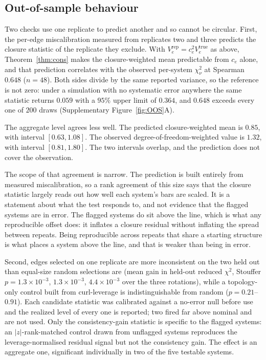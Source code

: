 \subsection{Out-of-sample behaviour}\label{sec:oos}
Two checks use one replicate to predict another and so cannot be circular. First, the per-edge
miscalibration measured from replicates two and three predicts the closure statistic of the
replicate they exclude. With $V_e^{\mathrm{rep}}=c_e^2V_e^{\mathrm{true}}$ as above,
Theorem~\ref{thm:cons} makes the closure-weighted mean predictable from $c_e$ alone, and that prediction correlates with the observed per-system $\chi^2_\nu$ at Spearman
$0.648$ ($n=48$). Both sides divide by the same reported variance, so the reference is not zero:
under a simulation with no systematic error anywhere the same statistic returns $0.059$ with a
$95\%$ upper limit of $0.364$, and $0.648$ exceeds every one of $200$ draws (Supplementary
Figure~\ref{fig:OOS}A).

The aggregate level agrees less well. The predicted closure-weighted mean is $0.85$, with interval
$[0.63,1.08]$. The observed degree-of-freedom-weighted value is $1.32$, with interval
$[0.81,1.80]$. The two intervals overlap, and the prediction does not cover the observation.

The scope of that agreement is narrow. The prediction is built entirely from measured
miscalibration, so a rank agreement of this size says that the closure statistic largely reads out
how well each system's bars are scaled. It is a statement about what the test responds to, and not
evidence that the flagged systems are in error. The flagged systems do sit above the line, which is
what any reproducible offset does: it inflates a closure residual without inflating the spread
between repeats. Being reproducible across repeats that share a starting structure is what places a
system above the line, and that is weaker than being in error.

Second, edges selected on one replicate are more inconsistent on the two held out than
equal-size random selections are (mean gain in held-out reduced $\chi^2$, Stouffer
$p=1.3\times10^{-3}$, $1.3\times10^{-3}$, $4.4\times10^{-3}$ over the three rotations), while a
topology-only control built from curl-leverage is indistinguishable from random
($p=0.21$--$0.91$). Each candidate statistic was calibrated against a no-error null before use and
the realized level of every one is reported; two fired far above nominal and are not used. Only the consistency-gain statistic is specific to the flagged systems: an
$|z|$-rank-matched control drawn from unflagged systems reproduces the leverage-normalised
residual signal but not the consistency gain. The effect is an aggregate one, significant
individually in two of the five testable systems.

